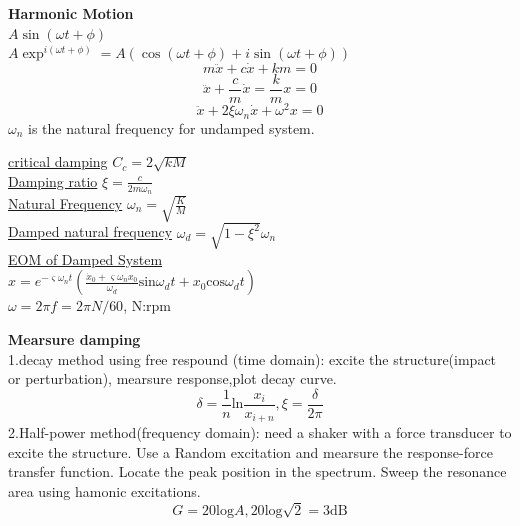 \documentclass{article}
\begin{document}
\thispagestyle{empty}
\begin{multicols*}{3}

  \noindent\textbf{Harmonic Motion}\\
  $A \sin(\omega t + \phi)$\\
  $A \exp^{i(\omega t + \phi)} = A(\cos(\omega t + \phi) + i\sin(\omega t + \phi))$\\
  \begin{equation*}
    m\ddot{x}+c\dot{x}+km=0
  \end{equation*}
\begin{equation*}
  \ddot{x}+\frac{c}{m}\dot{x}=\frac{k}{m}x=0
\end{equation*}
\begin{equation*}
  \ddot{x}+2\xi\omega_{n}\dot{x}+\omega^{2}x=0
\end{equation*}
$\omega_{n}$ is the natural frequency for undamped system.

  \underline{critical damping} $C_{c}=2\sqrt{kM}$\\
  \underline{Damping ratio} $\xi =\frac{c}{2m\omega_{n}}$\\
  \underline{Natural Frequency} $\omega_{n}=\sqrt{\frac{K}{M}}$\\
  \underline{Damped natural frequency} $\omega_{d}=\sqrt{1-\xi^{2}}\omega_{n}$\\
  \underline{EOM of Damped System}\\
  $x=e^{-\varsigma \omega_{n}t} (\frac{\dot{x}_{0}+\varsigma \omega_{n}x_{0}}{\omega_{d}}\text{sin}\omega_{d}t+x_{0}\text{cos}\omega_{d}t)$\\
  $\omega=2\pi f=2\pi N/60$, N:rpm

\noindent\textbf{Mearsure damping}\\
1.decay method using free respound (time domain):
excite the structure(impact or perturbation), mearsure response,plot decay curve.
\begin{equation*}
  \delta=\frac{1}{n}\text{ln}\frac{x_{i}}{x_{i+n}}, \xi =\frac{\delta}{2\pi}
\end{equation*}
2.Half-power method(frequency domain): need a shaker with a force transducer to excite the structure. Use a Random excitation and mearsure the response-force transfer function. Locate the peak position in the spectrum.
Sweep the resonance area using hamonic excitations.
\begin{equation*}
  G=20\text{log}A,20\text{log}\sqrt{2}=3\text{dB}
\end{equation*}


\end{multicols*}
\end{document}
